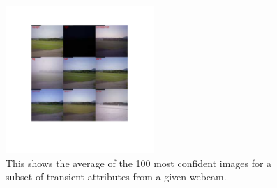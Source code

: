 \documentclass[10pt,twocolumn,letterpaper]{article}
\begin{document}
\begin{figure}[t]
	\centering
		\includegraphics[width=0.5\textwidth, trim= 35mm 50mm 30mm 31mm]{figs/montage_pruned_cam_7211.pdf}
		\caption{This shows the average of the 100 most confident images for
             a subset of transient attributes from a given webcam.} 
		\label{fig:netvis}
\end{figure}
\end{document}
